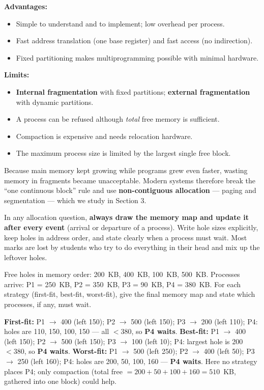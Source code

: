 \documentclass[11pt]{article}
\newcommand{\cle}[1]{{\popxbold\color{popdark}#1}}
\begin{document}
\begin{aretenir}
\textbf{Advantages:}
\begin{itemize}
\item Simple to understand and to implement; low overhead per process.
\item Fast address translation (one base register) and fast access (no indirection).
\item Fixed partitioning makes multiprogramming possible with minimal hardware.
\end{itemize}
\textbf{Limits:}
\begin{itemize}
\item \textbf{Internal fragmentation} with fixed partitions; \textbf{external fragmentation} with dynamic partitions.
\item A process can be refused although \emph{total} free memory is sufficient.
\item Compaction is expensive and needs relocation hardware.
\item The maximum process size is limited by the largest single free block.
\end{itemize}
Because main memory kept growing while programs grew even faster, wasting memory in fragments became unacceptable. Modern systems therefore break the ``one continuous block'' rule and use \textbf{non-contiguous allocation} — \cle{paging} and \cle{segmentation} — which we study in Section 3.
\end{aretenir}

\begin{attention}
In any allocation question, \textbf{always draw the memory map and update it after every event} (arrival or departure of a process). Write hole sizes explicitly, keep holes in address order, and state clearly when a process must wait. Most marks are lost by students who try to do everything in their head and mix up the leftover holes.
\end{attention}

\begin{exercice}
Free holes in memory order: 200~KB, 400~KB, 100~KB, 500~KB. Processes arrive: P1 = 250~KB, P2 = 350~KB, P3 = 90~KB, P4 = 380~KB. For each strategy (first-fit, best-fit, worst-fit), give the final memory map and state which processes, if any, must wait.
\end{exercice}

\begin{corrige}[Exercise 1]
\textbf{First-fit:} P1 $\to$ 400 (left 150); P2 $\to$ 500 (left 150); P3 $\to$ 200 (left 110); P4: holes are 110, 150, 100, 150 — all $< 380$, so \textbf{P4 waits}.
\textbf{Best-fit:} P1 $\to$ 400 (left 150); P2 $\to$ 500 (left 150); P3 $\to$ 100 (left 10); P4: largest hole is 200 $< 380$, so \textbf{P4 waits}.
\textbf{Worst-fit:} P1 $\to$ 500 (left 250); P2 $\to$ 400 (left 50); P3 $\to$ 250 (left 160); P4: holes are 200, 50, 100, 160 — \textbf{P4 waits}. Here no strategy places P4; only compaction (total free $= 200+50+100+160 = 510$~KB, gathered into one block) could help.
\end{corrige}
\end{document}
